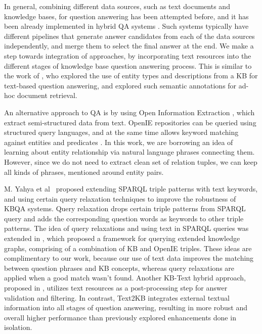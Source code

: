 In general, combining different data sources, such as text documents and knowledge bases, for question answering has been attempted before, and it has been already implemented in hybrid QA systems \cite{Barker12,baudivs2015modeling}.
Such systems typically have different pipelines that generate answer candidates from each of the data sources independently, and merge them to select the final answer at the end.
We make a step towards integration of approaches, by incorporating text resources into the different stages of knowledge base question answering process.
This is similar to the work of \cite{Sun:2015:ODQ:2736277.2741651}, who explored the use of entity types and descriptions from a KB for text-based question answering, and \cite{dalton2014entity} explored such semantic annotations for ad-hoc document retrieval.

An alternative approach to QA is by using Open Information Extraction \cite{fader2011identifying}, which extract semi-structured data from text.
OpenIE repositories can be queried using structured query languages, and at the same time allows keyword matching against entities and predicates \cite{Fader:2014:OQA:2623330.2623677}.
In this work, we are borrowing an idea of learning about entity relationship via natural language phrases connecting them.
However, since we do not need to extract clean set of relation tuples, we can keep all kinds of phrases, mentioned around entity pairs.

M. Yahya et al~\cite{yahya2013robust} proposed extending SPARQL triple patterns with text keywords, and using certain query relaxation techniques to improve the robustness of KBQA systems.
Query relaxation drops certain triple patterns from SPARQL query and adds the corresponding question words as keywords to other triple patterns.
The idea of query relaxations and using text in SPARQL queries was extended in \cite{yahya2016relationship}, which proposed a framework for querying extended knowledge graphs, comprising of a combination of KB and OpenIE triples.
These ideas are complimentary to our work, because our use of text data improves the matching between question phrases and KB concepts, whereas query relaxations are applied when a good match wasn't found.
Another KB-Text hybrid approach, proposed in \cite{xu2016enhancing}, utilizes text resources as a post-processing step for answer validation and filtering. In contrast, Text2KB integrates external textual information into all stages of question answering, resulting in more robust and overall higher performance than previously explored enhancements done in isolation.


